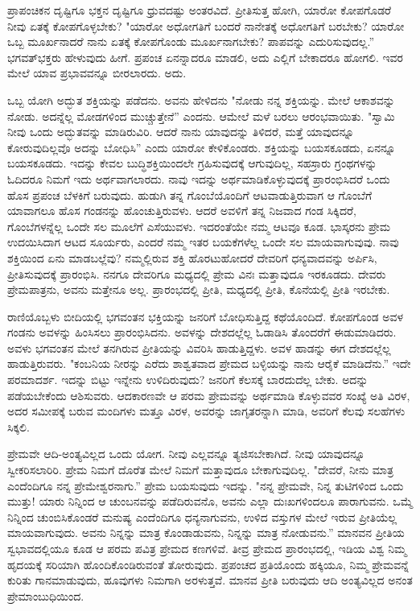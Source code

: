 ಪ್ರಾಪಂಚಿಕನ ದೃಷ್ಟಿಗೂ ಭಕ್ತನ ದೃಷ್ಟಿಗೂ ಧ್ರುವದಷ್ಟು ಅಂತರವಿದೆ. ಪ್ರೀತಿಸುತ್ತ ಹೋಗಿ, ಯಾರೋ ಕೋಪಗೊಡರೆ ನೀವು ಏತಕ್ಕೆ ಕೋಪಗೊಳ್ಳಬೇಕು? "ಯಾರೋ ಅಧೋಗತಿಗೆ ಬಂದರೆ ನಾನೇತಕ್ಕೆ ಅಧೋಗತಿಗೆ ಬರಬೇಕು? ಯಾರೋ ಒಬ್ಬ ಮೂರ್ಖನಾದರೆ ನಾನು ಏತಕ್ಕೆ ಕೋಪಗೊಂಡು ಮೂರ್ಖನಾಗಬೇಕು? ಪಾಪವನ್ನು ಎದುರಿಸುವುದಲ್ಲ.” ಭಗವತ್‌ಭಕ್ತರು ಹೇಳುವುದು ಹೀಗೆ. ಪ್ರಪಂಚ ಏನನ್ನಾದರೂ ಮಾಡಲಿ, ಅದು ಎಲ್ಲಿಗೆ ಬೇಕಾದರೂ ಹೋಗಲಿ. ಇವರ ಮೇಲೆ ಯಾವ ಪ್ರಭಾವವನ್ನೂ ಬೀರಲಾರದು. ಅದು.

ಒಬ್ಬ ಯೋಗಿ ಅದ್ಭುತ ಶಕ್ತಿಯನ್ನು ಪಡೆದನು. ಅವನು ಹೇಳಿದನು "ನೋಡು ನನ್ನ ಶಕ್ತಿಯನ್ನು. ಮೇಲೆ ಆಕಾಶವನ್ನು ನೋಡು. ಅದನ್ನೆಲ್ಲ ಮೋಡಗಳಿಂದ ಮುಚ್ಚುತ್ತೇನೆ'' ಎಂದನು. ಆಮೇಲೆ ಮಳೆ ಬರಲು ಆರಂಭವಾಯಿತು. "ಸ್ವಾಮಿ ನೀವು ಒಂದು ಅದ್ಭುತವನ್ನು ಮಾಡಿರುವಿರಿ. ಆದರೆ ನಾನು ಯಾವುದನ್ನು ತಿಳಿದರೆ, ಮತ್ತೆ ಯಾವುದನ್ನೂ ಕೋರುವುದಿಲ್ಲವೊ ಅದನ್ನು ಬೋಧಿಸಿ'' ಎಂದು ಯಾರೋ ಕೇಳಿಕೊಂಡರು. ಶಕ್ತಿಯನ್ನು ಬಯಸಕೂಡದು, ಏನನ್ನೂ ಬಯಸಕೂಡದು. ಇದನ್ನು ಕೇವಲ ಬುದ್ಧಿಶಕ್ತಿಯಿಂದಲೇ ಗ್ರಹಿಸುವುದಕ್ಕೆ ಆಗುವುದಿಲ್ಲ, ಸಹಸ್ರಾರು ಗ್ರಂಥಗಳನ್ನು ಓದಿದರೂ ನಿಮಗೆ ಇದು ಅರ್ಥವಾಗಲಾರದು. ನಾವು ಇದನ್ನು ಅರ್ಥಮಾಡಿಕೊಳ್ಳುವುದಕ್ಕೆ ಪ್ರಾರಂಭಿಸಿದರೆ ಒಂದು ಹೊಸ ಪ್ರಪಂಚ ಬೆಳಕಿಗೆ ಬರುವುದು. ಹುಡುಗಿ ತನ್ನ ಗೊಂಬೆಯೊಂದಿಗೆ ಆಟವಾಡುತ್ತಿರುವಾಗ ಆ ಗೊಂಬೆಗೆ ಯಾವಾಗಲೂ ಹೊಸ ಗಂಡನನ್ನು ಹೊಂಚುತ್ತಿರುವಳು. ಆದರೆ ಅವಳಿಗೆ ತನ್ನ ನಿಜವಾದ ಗಂಡ ಸಿಕ್ಕಿದರೆ, ಗೊಂಬೆಗಳನ್ನೆಲ್ಲ ಒಂದೇ ಸಲ ಮೂಲೆಗೆ ಎಸೆಯುವಳು. ಇದರಂತೆಯೇ ನಮ್ಮ ಆಟವೂ ಕೂಡ. ಭಾಸ್ಕರನು ಪ್ರೇಮ ಉದಯಿಸಿದಾಗ ಆಟದ ಸೂರ್ಯರು, ಎಂದರೆ ನಮ್ಮ ಇತರ ಬಯಕೆಗಳೆಲ್ಲ ಒಂದೇ ಸಲ ಮಾಯವಾಗುವುವು. ನಾವು ಶಕ್ತಿಯಿಂದ ಏನು ಮಾಡಬಲ್ಲೆವು? ನಮ್ಮಲ್ಲಿರುವ ಶಕ್ತಿ ಹೊರಟುಹೋದರೆ ದೇವರಿಗೆ ಧನ್ಯವಾದವನ್ನು ಅರ್ಪಿಸಿ, ಪ್ರೀತಿಸುವುದಕ್ಕೆ ಪ್ರಾರಂಭಿಸಿ. ನನಗೂ ದೇವರಿಗೂ ಮಧ್ಯದಲ್ಲಿ ಪ್ರೇಮ ವಿನಃ ಮತ್ತಾವುದೂ ಇರಕೂಡದು. ದೇವರು ಪ್ರೇಮಪಾತ್ರನು, ಅವನು ಮತ್ತೇನೂ ಅಲ್ಲ. ಪ್ರಾರಂಭದಲ್ಲಿ ಪ್ರೀತಿ, ಮಧ್ಯದಲ್ಲಿ ಪ್ರೀತಿ, ಕೊನೆಯಲ್ಲಿ ಪ್ರೀತಿ ಇರಬೇಕು.

ರಾಣಿಯೊಬ್ಬಳು ಬೀದಿಯಲ್ಲಿ ಭಗವಂತನ ಭಕ್ತಿಯನ್ನು ಜನರಿಗೆ ಬೋಧಿಸುತ್ತಿದ್ದ ಕಥೆಯೊಂದಿದೆ. ಕೋಪಗೊಂಡ ಅವಳ ಗಂಡನು ಅವಳನ್ನು ಹಿಂಸಿಸಲು ಪ್ರಾರಂಭಿಸಿದನು. ಅವಳನ್ನು ದೇಶದಲ್ಲೆಲ್ಲ ಓಡಾಡಿಸಿ ತೊಂದರೆಗೆ ಈಡುಮಾಡಿದರು. ಅವಳು ಭಗವಂತನ ಮೇಲೆ ತನಗಿರುವ ಪ್ರೀತಿಯನ್ನು ವಿವರಿಸಿ ಹಾಡುತ್ತಿದ್ದಳು. ಅವಳ ಹಾಡನ್ನು ಈಗ ದೇಶದಲ್ಲೆಲ್ಲ ಹಾಡುತ್ತಿರುವರು. "ಕಂಬನಿಯ ನೀರನ್ನು ಎರೆದು ಶಾಶ್ವತವಾದ ಪ್ರೇಮದ ಬಳ್ಳಿಯನ್ನು ನಾನು ಆರೈಕೆ ಮಾಡಿದೆನು.” ಇದೇ ಪರಮಾದರ್ಶ. ಇದನ್ನು ಬಿಟ್ಟು ಇನ್ನೇನು ಉಳಿದಿರುವುದು? ಜನರಿಗೆ ಕೆಲಸಕ್ಕೆ ಬಾರದುದೆಲ್ಲ ಬೇಕು. ಅದನ್ನು ಪಡೆಯಬೇಕೆಂದು ಆಶಿಸುವರು. ಆದಕಾರಣವೇ ಆ ಪರಮ ಪ್ರೇಮವನ್ನು ಅರ್ಥಮಾಡಿ ಕೊಳ್ಳುವವರ ಸಂಖ್ಯೆ ಅತಿ ವಿರಳ, ಅದರ ಸಮೀಪಕ್ಕೆ ಬರುವ ಮಂದಿಗಳು ಮತ್ತೂ ವಿರಳ, ಅವರನ್ನು ಜಾಗೃತರನ್ನಾಗಿ ಮಾಡಿ, ಅವರಿಗೆ ಕೆಲವು ಸಲಹೆಗಳು ಸಿಕ್ಕಲಿ.

ಪ್ರೇಮವೇ ಆದಿ-ಅಂತ್ಯವಿಲ್ಲದ ಒಂದು ಯೋಗ. ನೀವು ಎಲ್ಲವನ್ನೂ ತ್ಯಜಿಸಬೇಕಾಗಿದೆ. ನೀವು ಯಾವುದನ್ನೂ ಸ್ವೀಕರಿಸಲಾರಿರಿ. ಪ್ರೇಮ ನಿಮಗೆ ದೊರೆತ ಮೇಲೆ ನಿಮಗೆ ಮತ್ತಾವುದೂ ಬೇಕಾಗುವುದಿಲ್ಲ. "ದೇವರೆ, ನೀನು ಮಾತ್ರ ಎಂದೆಂದಿಗೂ ನನ್ನ ಪ್ರೇಮೇಶ್ವರನಾಗು.” ಪ್ರೇಮ ಬಯಸುವುದು ಇದನ್ನು. "ನನ್ನ ಪ್ರೇಮವೇ, ನಿನ್ನ ತುಟಿಗಳಿಂದ ಒಂದು ಮುತ್ತು! ಯಾರು ನಿನ್ನಿಂದ ಆ ಚುಂಬನವನ್ನು ಪಡೆದಿರುವನೊ, ಅವನು ಎಲ್ಲಾ ದುಃಖಗಳಿಂದಲೂ ಪಾರಾಗುವನು. ಒಮ್ಮೆ ನಿನ್ನಿಂದ ಚುಂಬಿಸಿಕೊಂಡರೆ ಮನುಷ್ಯ ಎಂದೆಂದಿಗೂ ಧನ್ಯನಾಗುವನು, ಉಳಿದ ವಸ್ತುಗಳ ಮೇಲೆ ಇರುವ ಪ್ರೀತಿಯೆಲ್ಲ ಮಾಯವಾಗುವುದು. ಅವನು ನಿನ್ನನ್ನು ಮಾತ್ರ ಕೊಂಡಾಡುವನು, ನಿನ್ನನ್ನು ಮಾತ್ರ ನೋಡುವನು.” ಮಾನವನ ಪ್ರೀತಿಯ ಸ್ವಭಾವದಲ್ಲಿಯೂ ಕೂಡ ಆ ಪರಮ ಪವಿತ್ರ ಪ್ರೇಮದ ಕಣಗಳಿವೆ. ತೀವ್ರ ಪ್ರೇಮದ ಪ್ರಾರಂಭದಲ್ಲಿ, ಇಡಿಯ ವಿಶ್ವ ನಿಮ್ಮ ಹೃದಯಕ್ಕೆ ಸರಿಯಾಗಿ ಹೊಂದಿಕೊಂಡಿರುವಂತೆ ತೋರುವುದು. ಪ್ರಪಂಚದ ಪ್ರತಿಯೊಂದು ಹಕ್ಕಿಯೂ, ನಿಮ್ಮ ಪ್ರೇಮವನ್ನೆ ಕುರಿತು ಗಾನಮಾಡುವುದು, ಹೂವುಗಳು ನಿಮಗಾಗಿ ಅರಳುತ್ತವೆ. ಮಾನವ ಪ್ರೀತಿ ಬರುವುದು ಆದಿ ಅಂತ್ಯವಿಲ್ಲದ ಅನಂತ ಪ್ರೇಮಾಂಬುಧಿಯಿಂದ.


